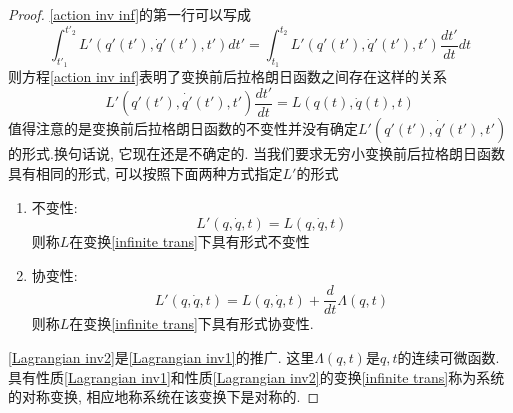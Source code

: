 \documentclass[a4paper,11pt]{book}
\newtheorem{proof}{证明}[section]
\begin{document}
\begin{proof}
  \eqref{action inv inf}的第一行可以写成
  \begin{equation*}
    \int_{t'_1}^{t'_2}L'(q'(t'),\dot{q}'(t'),t')dt'=\int_{t_1}^{t_2}L'(q'(t'),\dot{q}'(t'),t')\frac{dt'}{dt}dt
  \end{equation*}
  则方程\eqref{action inv inf}表明了变换前后拉格朗日函数之间存在这样的关系
  \begin{equation}\label{Lagrangian trans}
    L'(q'(t'),\dot{q'}(t'),t')\frac{dt'}{dt}=L(q(t),\dot{q}(t),t)
  \end{equation}
  值得注意的是变换前后拉格朗日函数的不变性并没有确定$L'(q'(t'),\dot{q'}(t'),t')$的形式.换句话说, 它现在还是不确定的. 当我们要求无穷小变换前后拉格朗日函数具有相同的形式, 可以按照下面两种方式指定$L'$的形式
  \begin{enumerate}[(1)]
    \item 不变性:\\
    \begin{equation}\label{Lagrangian inv1}
      L'(q,\dot{q},t)=L(q,\dot{q},t)
    \end{equation}
    则称$L$在变换\eqref{infinite trans}下具有形式不变性
    \item 协变性:\\
    \begin{equation}\label{Lagrangian inv2}
      L'(q,\dot{q},t)=L(q,\dot{q},t)+\frac{d}{dt}\Lambda(q,t)
    \end{equation}
    则称$L$在变换\eqref{infinite trans}下具有形式协变性.
  \end{enumerate}
  \eqref{Lagrangian inv2}是\eqref{Lagrangian inv1}的推广. 这里$\Lambda(q,t)$是$q,t$的连续可微函数. 具有性质\eqref{Lagrangian inv1}和性质\eqref{Lagrangian inv2}的变换\eqref{infinite trans}称为系统的对称变换, 相应地称系统在该变换下是对称的.


\end{proof}
\end{document}
